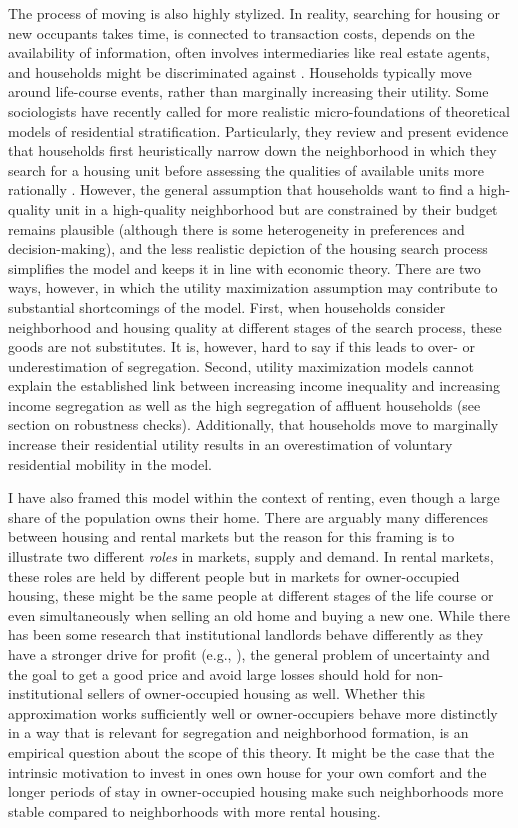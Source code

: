 The process of moving is also highly stylized. In reality, searching for housing or new occupants takes time, is connected to transaction costs, depends on the availability of information, often involves intermediaries like real estate agents, and households might be discriminated against \citep{hanMicrostructureHousingMarkets2015}. Households typically move around life-course events, rather than marginally increasing their utility. Some sociologists have recently called for more realistic micro-foundations of theoretical models of residential stratification. Particularly, they review and present evidence that households first heuristically narrow down the neighborhood in which they search for a housing unit before assessing the qualities of available units more rationally \citep{krysanCycleSegregationSocial2017, bruchChoiceSetFormation2019}. However, the general assumption that households want to find a high-quality unit in a high-quality neighborhood but are constrained by their budget remains plausible (although there is some heterogeneity in preferences and decision-making), and the less realistic depiction of the housing search process simplifies the model and keeps it in line with economic theory. There are two ways, however, in which the utility maximization assumption may contribute to substantial shortcomings of the model. First, when households consider neighborhood and housing quality at different stages of the search process, these goods are not substitutes. It is, however, hard to say if this leads to over- or underestimation of segregation. Second, utility maximization models cannot explain the established link between increasing income inequality and increasing income segregation as well as the high segregation of affluent households (see section on robustness checks). Additionally, that households move to marginally increase their residential utility results in an overestimation of voluntary residential mobility in the model.

I have also framed this model within the context of renting, even though a large share of the population owns their home. There are arguably many differences between housing and rental markets but the reason for this framing is to illustrate two different \textit{roles} in markets, supply and demand. In rental markets, these roles are held by different people but in markets for owner-occupied housing, these might be the same people at different stages of the life course or even simultaneously when selling an old home and buying a new one. While there has been some research that institutional landlords behave differently as they have a stronger drive for profit (e.g., \cite{gorbackImpactInstitutionalOwners2025}), the general problem of uncertainty and the goal to get a good price and avoid large losses should hold for non-institutional sellers of owner-occupied housing as well. Whether this approximation works sufficiently well or owner-occupiers behave more distinctly in a way that is relevant for segregation and neighborhood formation, is an empirical question about the scope of this theory. It might be the case that the intrinsic motivation to invest in ones own house for your own comfort and the longer periods of stay in owner-occupied housing make such neighborhoods more stable compared to neighborhoods with more rental housing.